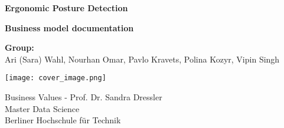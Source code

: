 \begin{titlepage}
    \begin{center}
        \vspace*{1cm}
        
        \Huge
        \textbf{Ergonomic Posture Detection}
        
        \vspace{0.5cm}
        \LARGE
        \textbf{Business model documentation}
        
        \vspace{1.5cm}
        \Large
        \textbf{Group:}\\
        Ari (Sara) Wahl, Nourhan Omar, Pavlo Kravets, Polina Kozyr, Vipin Singh
        
        \vfill
        \texttt{[image: cover\_image.png]}
        \vfill
        
        \Large
        Business Values - Prof. Dr. Sandra Dressler\\
        Master Data Science\\
        Berliner Hochschule für Technik
        
    \end{center}
\end{titlepage}